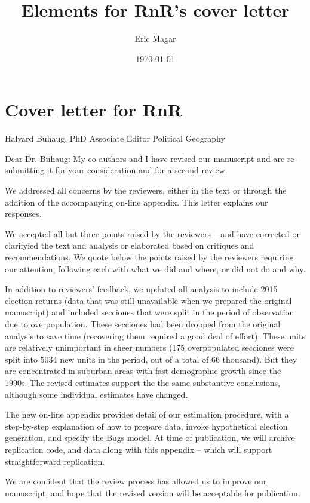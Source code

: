 \documentclass{article}
\author{Eric Magar}
\date{\today}
\title{Elements for RnR's cover letter}
\begin{document}
\maketitle
\tableofcontents


\section{Cover letter for RnR}
\label{sec:orgheadline1}
Halvard Buhaug, PhD
Associate Editor
Political Geography

Dear Dr. Buhaug: My co-authors and I have revised our manuscript and are re-submitting it for your consideration and for a second review. 

We addressed all concerns by the reviewers, either in the text or through the addition of the accompanying on-line appendix. This letter explains our responses. 

We accepted all but three points raised by the reviewers -- and have corrected or clarifyied the text and analysis or elaborated based on critiques and recommendations. We quote below the points raised by the reviewers requiring our attention, following each with what we did and where, or did not do and why. 

In addition to reviewers' feedback, we updated all analysis to include 2015 election returns (data that was still unavailable when we prepared the original manuscript) and included secciones that were split in the period of observation due to overpopulation. These secciones had been dropped from the original analysis to save time (recovering them required a good deal of effort). These units are relatively unimportant in sheer numbers (175 overpopulated secciones were split into 5034 new units in the period, out of a total of 66 thousand). But they are concentrated in suburban areas with fast demographic growth since the 1990s. The revised estimates support the the same substantive conclusions, although some individual estimates have changed. 

The new on-line appendix provides detail of our estimation procedure, with a step-by-step explanation of how to prepare data, invoke hypothetical election generation, and specify the Bugs model. At time of publication, we will archive replication code, and data along with this appendix -- which will support straightforward replication.

We are confident that the review process has allowed us to improve our manuscript, and hope that the revised version will be acceptable for publication.
\end{document}
